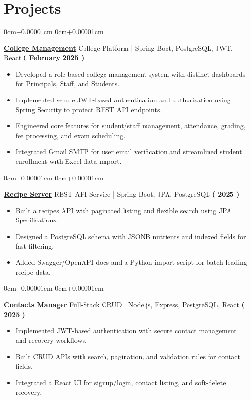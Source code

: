 \documentclass[10pt,a4paper]{article}
\newenvironment{highlights}{
    \begin{itemize}[
        topsep=0.10cm,
        parsep=0.10cm,
        partopsep=0pt,
        itemsep=0pt,
        leftmargin=10pt,
    ]
    }{
    \end{itemize}
}
\newenvironment{onecolentry}{
    \begin{adjustwidth}{
        0cm+0.00001cm
    }{
        0cm+0.00001cm
    }
    }{
    \end{adjustwidth}
}
\begin{document}
    \section{Projects}\label{sec:projects}
    \begin{onecolentry}
        \textbf{\href{https://github.com/jefino9488/college-management-server}{College Management}} College Platform | Spring Boot, PostgreSQL, JWT, React \hfill \textbf{( February 2025 )} \\
        \begin{highlights}
            \item Developed a role-based college management system with distinct dashboards for Principals, Staff, and Students.
            \item Implemented secure JWT-based authentication and authorization using Spring Security to protect REST API endpoints.
            \item Engineered core features for student/staff management, attendance, grading, fee processing, and exam scheduling.
            \item Integrated Gmail SMTP for user email verification and streamlined student enrollment with Excel data import.
        \end{highlights}
    \end{onecolentry}
    \vspace{0.1cm}
    \begin{onecolentry}
        \textbf{\href{https://github.com/Jefino9488/Recipe-Server}{Recipe Server}} REST API Service | Spring Boot, JPA, PostgreSQL \hfill \textbf{( 2025 )} \\
        \begin{highlights}
            \item Built a recipes API with paginated listing and flexible search using JPA Specifications.
            \item Designed a PostgreSQL schema with JSONB nutrients and indexed fields for fast filtering.
            \item Added Swagger/OpenAPI docs and a Python import script for batch loading recipe data.
        \end{highlights}
    \end{onecolentry}
    \vspace{0.1cm}
    \begin{onecolentry}
        \textbf{\href{https://github.com/Jefino9488/Contacts-Manager}{Contacts Manager}} Full-Stack CRUD | Node.js, Express, PostgreSQL, React \hfill \textbf{( 2025 )} \\
        \begin{highlights}
            \item Implemented JWT-based authentication with secure contact management and recovery workflows.
            \item Built CRUD APIs with search, pagination, and validation rules for contact fields.
            \item Integrated a React UI for signup/login, contact listing, and soft-delete recovery.
        \end{highlights}
    \end{onecolentry}
\end{document}
